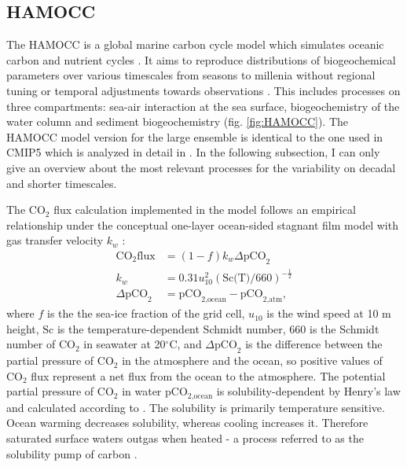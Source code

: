 \subsection{HAMOCC}
\label{sec:HAMOCC}
The \ac{HAMOCC} is a global marine carbon cycle model which simulates oceanic carbon and nutrient cycles \citep{Maier-Reimer1984,Maier-Reimer1993,Six1996}. It aims to reproduce distributions of biogeochemical parameters over various timescales from seasons to millenia without regional tuning or temporal adjustments towards observations \citep{Ilyina2013}. This includes processes on three compartments: sea-air interaction at the sea surface, biogeochemistry of the water column and sediment biogeochemistry (fig. \ref{fig:HAMOCC}). The \acs{HAMOCC} model version for the large ensemble is identical to the one used in \acs{CMIP5} which is analyzed in detail in \cite{Ilyina2013}. In the following subsection, I can only give an overview about the most relevant processes for the variability on decadal and shorter timescales.\newline

The CO$_2$ flux calculation implemented in the model follows an empirical relationship under the conceptual one-layer ocean-sided stagnant film model with gas transfer velocity $k_w$ \citep{Wanninkhof1992}: 
\begin{align*}
\text{CO}_2\text{flux} &= (1-f)k_w \Delta \text{pCO}_2 \\
				k_w &= 0.31 u_{10}^2(\text{Sc(T)}/660)^{-\frac{1}{2}}\\
				\Delta \text{pCO}_2 &= \text{pCO}_{2\text{,ocean}} - \text{pCO}_{2\text{,atm}} \text{,}
\end{align*}
where $f$ is the the sea-ice fraction of the grid cell, $u_{10}$ is the wind speed at 10 m height, $\text{Sc}$ is the temperature-dependent Schmidt number, 660 is the Schmidt number of CO$_2$ in seawater at 20$^\circ$C, and $\Delta \text{pCO}_2$ is the difference between the partial pressure of CO$_2$ in the atmosphere and the ocean, so positive values of CO$_2$ flux represent a net flux from the ocean to the atmosphere. The potential partial pressure of CO$_2$ in water pCO$_{2\text{,ocean}}$ is solubility-dependent by Henry's law and calculated according to \citep{Weiss1974}. The solubility is primarily temperature sensitive. Ocean warming decreases solubility, whereas cooling increases it. Therefore saturated surface waters outgas when heated - a process referred to as the solubility pump of carbon \citep{VolkHoffert1985}.\newline

